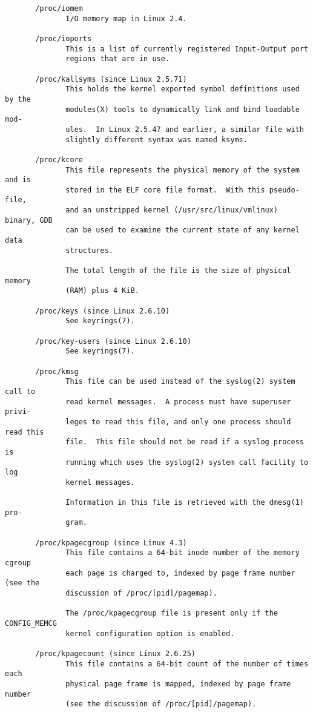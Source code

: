 \documentclass[]{article}
\begin{document}
\begin{verbatim}
       /proc/iomem
              I/O memory map in Linux 2.4.

       /proc/ioports
              This is a list of currently registered Input-Output port
              regions that are in use.

       /proc/kallsyms (since Linux 2.5.71)
              This holds the kernel exported symbol definitions used by the
              modules(X) tools to dynamically link and bind loadable mod‐
              ules.  In Linux 2.5.47 and earlier, a similar file with
              slightly different syntax was named ksyms.

       /proc/kcore
              This file represents the physical memory of the system and is
              stored in the ELF core file format.  With this pseudo-file,
              and an unstripped kernel (/usr/src/linux/vmlinux) binary, GDB
              can be used to examine the current state of any kernel data
              structures.

              The total length of the file is the size of physical memory
              (RAM) plus 4 KiB.

       /proc/keys (since Linux 2.6.10)
              See keyrings(7).

       /proc/key-users (since Linux 2.6.10)
              See keyrings(7).

       /proc/kmsg
              This file can be used instead of the syslog(2) system call to
              read kernel messages.  A process must have superuser privi‐
              leges to read this file, and only one process should read this
              file.  This file should not be read if a syslog process is
              running which uses the syslog(2) system call facility to log
              kernel messages.

              Information in this file is retrieved with the dmesg(1) pro‐
              gram.

       /proc/kpagecgroup (since Linux 4.3)
              This file contains a 64-bit inode number of the memory cgroup
              each page is charged to, indexed by page frame number (see the
              discussion of /proc/[pid]/pagemap).

              The /proc/kpagecgroup file is present only if the CONFIG_MEMCG
              kernel configuration option is enabled.

       /proc/kpagecount (since Linux 2.6.25)
              This file contains a 64-bit count of the number of times each
              physical page frame is mapped, indexed by page frame number
              (see the discussion of /proc/[pid]/pagemap).


\end{verbatim}
\end{document}
